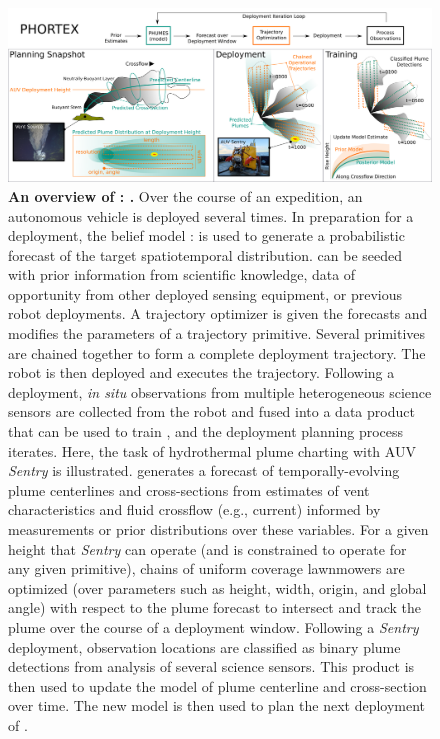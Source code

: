 \begin{figure}[h!]
    \centering
    \includegraphics[width=\columnwidth]{figures/summary_intro_figure.png}
    \caption[An overview of \PHORTEX: \phortex]{\textbf{An overview of \PHORTEX: \phortex.} Over the course of an expedition, an autonomous vehicle is deployed several times. In preparation for a deployment, the belief model \PHUMES: \phumes is used to generate a probabilistic forecast of the target spatiotemporal distribution. \PHUMES can be seeded with prior information from scientific knowledge, data of opportunity from other deployed sensing equipment, or previous robot deployments. A trajectory optimizer is given the forecasts and modifies the parameters of a trajectory primitive. Several primitives are chained together to form a complete deployment trajectory. The robot is then deployed and executes the trajectory. Following a deployment, \emph{in situ} observations from multiple heterogeneous science sensors are collected from the robot and fused into a data product that can be used to train \PHUMES, and the deployment planning process iterates. Here, the task of hydrothermal plume charting with AUV \emph{Sentry} is illustrated. \PHUMES generates a forecast of temporally-evolving plume centerlines and cross-sections from estimates of vent characteristics and fluid crossflow (e.g., current) informed by measurements or prior distributions over these variables. For a given height that \emph{Sentry} can operate (and is constrained to operate for any given primitive), chains of uniform coverage lawnmowers are optimized (over parameters such as height, width, origin, and global angle) with respect to the plume forecast to intersect and track the plume over the course of a deployment window. Following a \emph{Sentry} deployment, observation locations are classified as binary plume detections from analysis of several science sensors. This product is then used to update the \PHUMES model of plume centerline and cross-section over time. The new \PHUMES model is then used to plan the next deployment of \Sentry.}
    \label{fig:intro_summary}
\end{figure}


